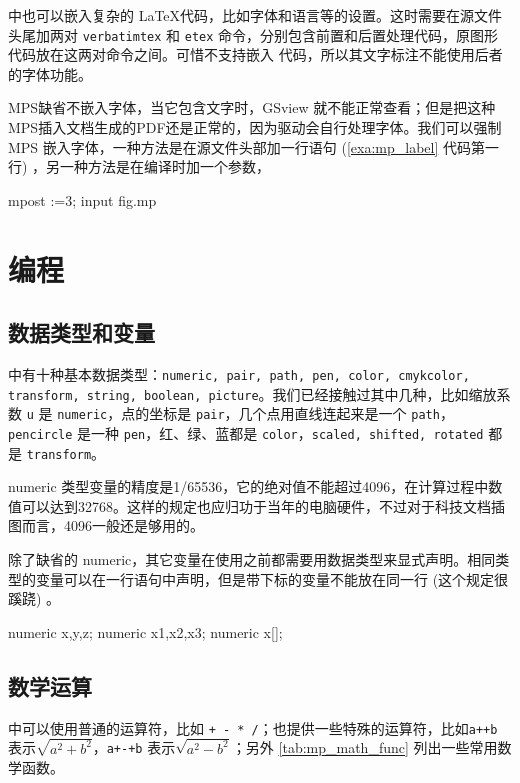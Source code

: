 \MP 中也可以嵌入复杂的 \LaTeX 代码，比如字体和语言等的设置。这时需要在源文件头尾加两对 \texttt{verbatimtex} 和 \texttt{etex} 命令，分别包含前置和后置处理代码，原图形代码放在这两对命令之间。可惜\MP 不支持嵌入 \XeLaTeX 代码，所以其文字标注不能使用后者的字体功能。

MPS缺省不嵌入字体，当它包含文字时，GSview 就不能正常查看；但是把这种MPS插入文档生成的PDF还是正常的，因为驱动会自行处理字体。我们可以强制 MPS 嵌入字体，一种方法是在源文件头部加一行语句 (\autoref{exa:mp_label} 代码第一行) ，另一种方法是在编译时加一个参数，

\begin{Code}[]
mpost \prologues:=3; input fig.mp
\end{Code}

\section{编程}
\subsection{数据类型和变量}

\MP 中有十种基本数据类型：\texttt{numeric, pair, path, pen, color, cmykcolor, transform, string, boolean, picture}。我们已经接触过其中几种，比如缩放系数 \texttt{u} 是 \texttt{numeric}，点的坐标是 \texttt{pair}，几个点用直线连起来是一个 \texttt{path}，\texttt{pencircle} 是一种 \texttt{pen}，红、绿、蓝都是 \texttt{color}，\texttt{scaled, shifted, rotated} 都是 \texttt{transform}。

numeric 类型变量的精度是1/65536，它的绝对值不能超过4096，在计算过程中数值可以达到32768。这样的规定也应归功于当年的电脑硬件，不过对于科技文档插图而言，4096一般还是够用的。

除了缺省的 numeric，其它变量在使用之前都需要用数据类型来显式声明。相同类型的变量可以在一行语句中声明，但是带下标的变量不能放在同一行 (这个规定很蹊跷) 。

\begin{Code}
numeric x,y,z;    %
numeric x1,x2,x3; %
numeric x[];      %
\end{Code}

\subsection{数学运算}

\MP 中可以使用普通的运算符，比如 \verb|+ - * /|；也提供一些特殊的运算符，比如\verb|a++b| 表示$\sqrt{a^2+b^2}$，\verb|a+-+b| 表示$\sqrt{a^2-b^2}$；另外 \autoref{tab:mp_math_func} 列出一些常用数学函数。

